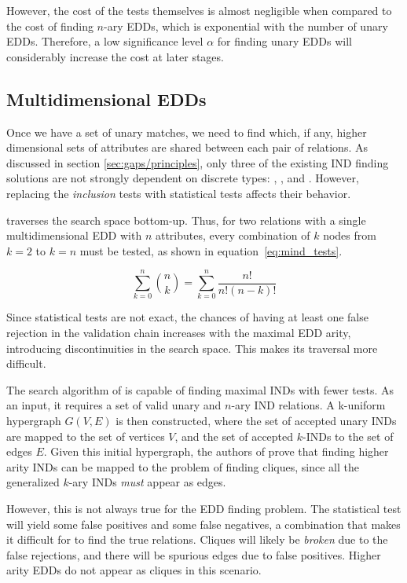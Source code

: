 However, the cost of the tests themselves is almost negligible when compared to the cost of
finding $n$-ary \glspl{EDD}, which is exponential with
the number of unary \glspl{EDD}. Therefore, a low significance level $\alpha$ for finding unary \glspl{EDD}
will considerably increase the cost at later stages.

\subsection{Multidimensional EDDs}
\label{sec:multidimensional_edd}
Once we have a set of unary matches, we need to find which, if any, higher dimensional
sets of attributes are shared between each pair of relations. As discussed in section
\ref{sec:gaps/principles}, only three of the existing \gls{IND} finding solutions are not strongly
dependent on discrete types: \Mind, \Zigzag, and \Find.
However, replacing the \emph{inclusion} tests with statistical tests affects their behavior.

\Mind traverses the search space bottom-up. Thus, for two relations with a single
multidimensional \gls{EDD} with $n$ attributes, every combination of $k$ nodes from $k = 2$
to $k = n$ must be tested, as shown in equation~\ref{eq:mind_tests}.

\begin{equation}
    \sum_{k=0}^{n}{\binom{n}{k}} = \sum_{k=0}^{n} \frac{n!}{n!(n - k)!}
    \label{eq:mind_tests}
\end{equation}

Since statistical tests are not exact, the chances of having
at least one false rejection in the validation chain
increases with the maximal \gls{EDD} arity, introducing
discontinuities in the search space. This makes its traversal more difficult.

The search algorithm of \Find is capable of finding
maximal \glspl{IND} with fewer tests. As an input, it requires a set of valid unary and $n$-ary
\gls{IND} relations. A k-uniform hypergraph $G(V,E)$ is then constructed, where the set of accepted
unary \glspl{IND} are mapped to the set of vertices $V$, and the set of accepted $k$-INDs to 
the set of edges $E$. 
Given this initial hypergraph, the authors of \Find prove that finding higher arity \glspl{IND} can be
mapped to the problem of finding cliques, since all the generalized $k$-ary \glspl{IND}
\emph{must} appear as edges.

However, this is not always true for the \gls{EDD} finding problem. The statistical test
will yield some false positives and some false negatives, a combination that makes it
difficult for \Find to find the true relations. Cliques will likely be \emph{broken} due
to the false rejections, and there will be spurious edges due to false positives.
Higher arity \glspl{EDD} do not appear as cliques in this scenario.

